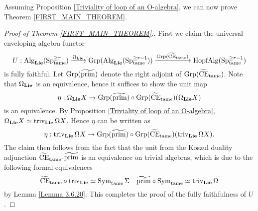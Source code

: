 Assuming Proposition \ref{Triviality of loop of an O-algebra}, we can now prove Theorem \ref{FIRST_MAIN_THEOREM}.
\begin{proof}
[Proof of Theorem \ref{FIRST_MAIN_THEOREM}:]
	First we claim the universal enveloping algebra functor
	\[
	U:
	\Alg_{\spLie}(\Sp^{\geq r}_{\tame}) 
	\xrightarrow{\Omega_{\spLie}}
	\Grp(\Alg_{\spLie}(\Sp^{\geq r-1}_{\tame}))
	\xrightarrow{\Grp(\tildeCE_{\tame})}
	\Hopfalgebra(\Sp^{\geq r-1}_{\tame})
	\]
	is fully faithful. 
    Let $\Grp(\widetilde{\Prim})$ denote the right adjoint of
    $\Grp(\tildeCE_{\tame})$. Note that $\Omega_{\spLie}$ is an equivalence, hence it suffices to show the unit map
    $$
    \eta:\Omega_{\spLie} X \to \Grp(\widetilde{\Prim})\circ \Grp(\tildeCE_{\tame}) (\Omega_{\spLie}X)
    $$
    is an equivalence.
    By Proposition \ref{Triviality of loop of an O-algebra}, $\Omega_{\spLie}X\simeq \trivial_{\spLie} \Omega X $.
    Hence $\eta$ can be written as
    $$
    \eta: \trivial_{\spLie} \Omega X \to 
    \Grp(\widetilde{\Prim})\circ \Grp(\tildeCE_{\tame}) (\trivial_{\spLie} \Omega X).
    $$
    The claim then follows from the fact that the unit from the Koszul duality adjunction $\tildeCE_{\tame}$-$\widetilde{\Prim}$ is an equivalence on trivial algebras, which is due to the following formal equivalences
    $$
    \tildeCE_{\tame} \circ \trivial_{\spLie} \simeq \Sym_{\tame}\Sigma
    \quad
    \widetilde{\Prim} \circ \Sym_{\tame} \simeq \trivial_{\spLie}\Omega
    $$
    by Lemma \ref{Lemma 3.6.20}.
    This completes the proof of the fully faithfulness of $U$.

\end{proof}
